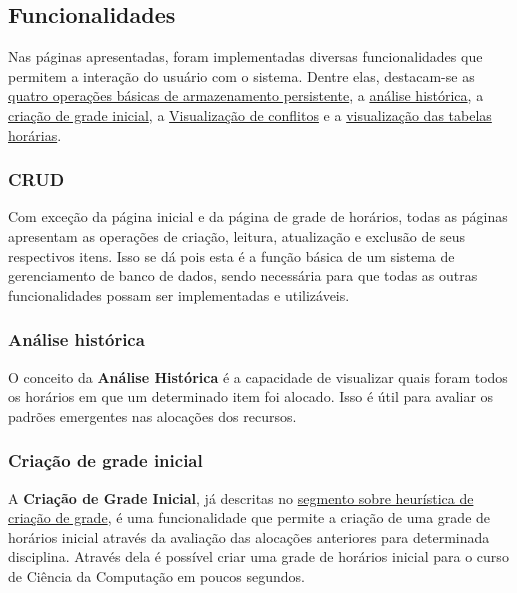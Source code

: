 \subsection{Funcionalidades} \label{ssec:funcionalidades}

Nas páginas apresentadas, foram implementadas diversas funcionalidades que permitem a interação do usuário com o sistema. Dentre elas, destacam-se as \hyperref[sssec:CRUD]{quatro operações básicas de armazenamento persistente}, a \hyperref[sssec:Análise histórica]{análise histórica}, a \hyperref[sssec:Criação de grade inicial]{criação de grade inicial}, a \hyperref[sssec:Visualização de conflitos]{Visualização de conflitos} e a \hyperref[sssec:Visualização de tabelas horárias]{visualização das tabelas horárias}.

\subsubsection*{CRUD} \label{sssec:CRUD}

Com exceção da página inicial e da página de grade de horários, todas as páginas apresentam as operações de criação, leitura, atualização e exclusão de seus respectivos itens. Isso se dá pois esta é a função básica de um sistema de gerenciamento de banco de dados, sendo necessária para que todas as outras funcionalidades possam ser implementadas e utilizáveis.

\subsubsection*{Análise histórica} \label{sssec:Análise histórica}

O conceito da \textbf{Análise Histórica} é a capacidade de visualizar quais foram todos os horários em que um determinado item foi alocado. Isso é útil para avaliar os padrões emergentes nas alocações dos recursos.

\subsubsection*{Criação de grade inicial} \label{sssec:Criação de grade inicial}

A \textbf{Criação de Grade Inicial}, já descritas no \hyperref[ssec:Heurística]{segmento sobre heurística de criação de grade}, é uma funcionalidade que permite a criação de uma grade de horários inicial através da avaliação das alocações anteriores para determinada disciplina. Através dela é possível criar uma grade de horários inicial para o curso de Ciência da Computação em poucos segundos.

